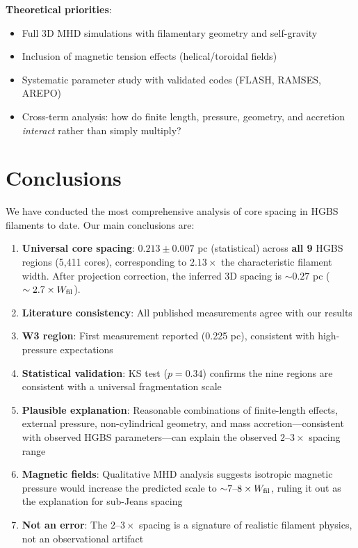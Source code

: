 \documentclass[11pt,a4paper]{article}
\begin{document}
\textbf{Theoretical priorities}:
\begin{itemize}
    \item Full 3D MHD simulations with filamentary geometry and self-gravity
    \item Inclusion of magnetic tension effects (helical/toroidal fields)
    \item Systematic parameter study with validated codes (FLASH, RAMSES, AREPO)
    \item Cross-term analysis: how do finite length, pressure, geometry, and accretion \textit{interact} rather than simply multiply?
\end{itemize}

\section{Conclusions}

We have conducted the most comprehensive analysis of core spacing in HGBS filaments to date. Our main conclusions are:

\begin{enumerate}
    \item \textbf{Universal core spacing}: $0.213 \pm 0.007$ pc (statistical) across \textbf{all 9} HGBS regions (5,411 cores), corresponding to $2.13\times$ the characteristic filament width. After projection correction, the inferred 3D spacing is $\sim0.27$ pc ($\sim2.7\times W_{\rm fil}$).
    \item \textbf{Literature consistency}: All published measurements agree with our results
    \item \textbf{W3 region}: First measurement reported (0.225 pc), consistent with high-pressure expectations
    \item \textbf{Statistical validation}: KS test ($p=0.34$) confirms the nine regions are consistent with a universal fragmentation scale
    \item \textbf{Plausible explanation}: Reasonable combinations of finite-length effects, external pressure, non-cylindrical geometry, and mass accretion—consistent with observed HGBS parameters—can explain the observed $2$--$3\times$ spacing range
    \item \textbf{Magnetic fields}: Qualitative MHD analysis suggests isotropic magnetic pressure would increase the predicted scale to $\sim7$--$8\times W_{\rm fil}$, ruling it out as the explanation for sub-Jeans spacing
    \item \textbf{Not an error}: The $2$--$3\times$ spacing is a signature of realistic filament physics, not an observational artifact
\end{enumerate}
\end{document}
